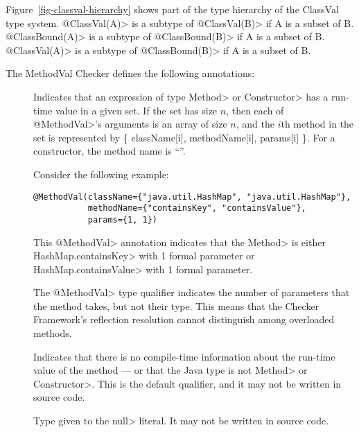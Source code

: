 Figure~\ref{fig-classval-hierarchy} shows part of the type hierarchy of  the
ClassVal type system.
\<@ClassVal(A)> is a subtype of \<@ClassVal(B)> if A is a subset of B.
\<@ClassBound(A)> is a subtype of \<@ClassBound(B)> if A is a subset of B.
\<@ClassVal(A)> is a subtype of \<@ClassBound(B)> if A is a subset of B.



The MethodVal Checker defines the following annotations:

\begin{description}
\item[]
Indicates that an expression of type \<Method> or \<Constructor> has a
run-time value in a given set.  If the set has size $n$, then each of
\<@MethodVal>'s arguments is an array of size $n$, and the $i$th method in the set is
represented by \{ className[i], methodName[i], params[i] \}.
For a constructor, the method name is ``''.

Consider the following example:

\begin{Verbatim}
@MethodVal(className={"java.util.HashMap", "java.util.HashMap"},
           methodName={"containsKey", "containsValue"},
           params={1, 1})
\end{Verbatim}

\noindent
This \<@MethodVal> annotation indicates that the \<Method>
is either \<HashMap.containsKey> with 1 formal parameter or
\<HashMap.containsValue> with 1 formal parameter.

The \<@MethodVal> type qualifier indicates the number of
parameters that the method takes, but not their type.  This means that the
Checker Framework's reflection resolution cannot distinguish among
overloaded methods.

\item[] Indicates that there is no
  compile-time information about the run-time value of the method --- or
  that the Java type is not \<Method> or \<Constructor>.
  This is the default qualifier, and it may not be written in source code.

\item[] Type given to the \<null> literal.
  It may not be written in source code.
\end{description}

